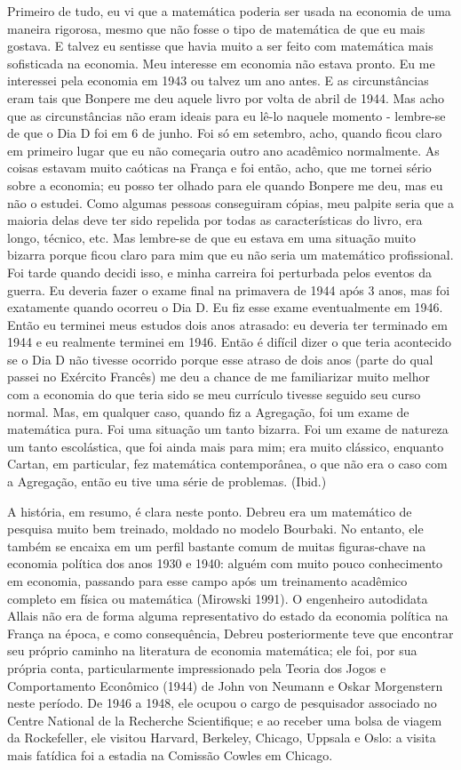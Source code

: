 \documentclass[a4paper,12pt]{article}[abntex2]
\begin{document}
Primeiro de tudo, eu vi que a matemática poderia ser usada na economia de uma maneira rigorosa, mesmo que não fosse o tipo de matemática de que eu mais gostava. E talvez eu sentisse que havia muito a ser feito com matemática mais sofisticada na economia. Meu interesse em economia não estava pronto. Eu me interessei pela economia em 1943 ou talvez um ano antes. E as circunstâncias eram tais que Bonpere me deu aquele livro por volta de abril de 1944. Mas acho que as circunstâncias não eram ideais para eu lê-lo naquele momento - lembre-se de que o Dia D foi em 6 de junho. Foi só em setembro, acho, quando ficou claro em primeiro lugar que eu não começaria outro ano acadêmico normalmente. As coisas estavam muito caóticas na França e foi então, acho, que me tornei sério sobre a economia; eu posso ter olhado para ele quando Bonpere me deu, mas eu não o estudei. Como algumas pessoas conseguiram cópias, meu palpite seria que a maioria delas deve ter sido repelida por todas as características do livro, era longo, técnico, etc. Mas lembre-se de que eu estava em uma situação muito bizarra porque ficou claro para mim que eu não seria um matemático profissional. Foi tarde quando decidi isso, e minha carreira foi perturbada pelos eventos da guerra. Eu deveria fazer o exame final na primavera de 1944 após 3 anos, mas foi exatamente quando ocorreu o Dia D. Eu fiz esse exame eventualmente em 1946. Então eu terminei meus estudos dois anos atrasado: eu deveria ter terminado em 1944 e eu realmente terminei em 1946. Então é difícil dizer o que teria acontecido se o Dia D não tivesse ocorrido porque esse atraso de dois anos (parte do qual passei no Exército Francês) me deu a chance de me familiarizar muito melhor com a economia do que teria sido se meu currículo tivesse seguido seu curso normal. Mas, em qualquer caso, quando fiz a Agregação, foi um exame de matemática pura. Foi uma situação um tanto bizarra. Foi um exame de natureza um tanto escolástica, que foi ainda mais para mim; era muito clássico, enquanto Cartan, em particular, fez matemática contemporânea, o que não era o caso com a Agregação, então eu tive uma série de problemas. (Ibid.)

A história, em resumo, é clara neste ponto. Debreu era um matemático de pesquisa muito bem treinado, moldado no modelo Bourbaki. No entanto, ele também se encaixa em um perfil bastante comum de muitas figuras-chave na economia política dos anos 1930 e 1940: alguém com muito pouco conhecimento em economia, passando para esse campo após um treinamento acadêmico completo em física ou matemática (Mirowski 1991). O engenheiro autodidata Allais não era de forma alguma representativo do estado da economia política na França na época, e como consequência, Debreu posteriormente teve que encontrar seu próprio caminho na literatura de economia matemática; ele foi, por sua própria conta, particularmente impressionado pela Teoria dos Jogos e Comportamento Econômico (1944) de John von Neumann e Oskar Morgenstern neste período. De 1946 a 1948, ele ocupou o cargo de pesquisador associado no Centre National de la Recherche Scientifique; e ao receber uma bolsa de viagem da Rockefeller, ele visitou Harvard, Berkeley, Chicago, Uppsala e Oslo: a visita mais fatídica foi a estadia na Comissão Cowles em Chicago.
\end{document}

